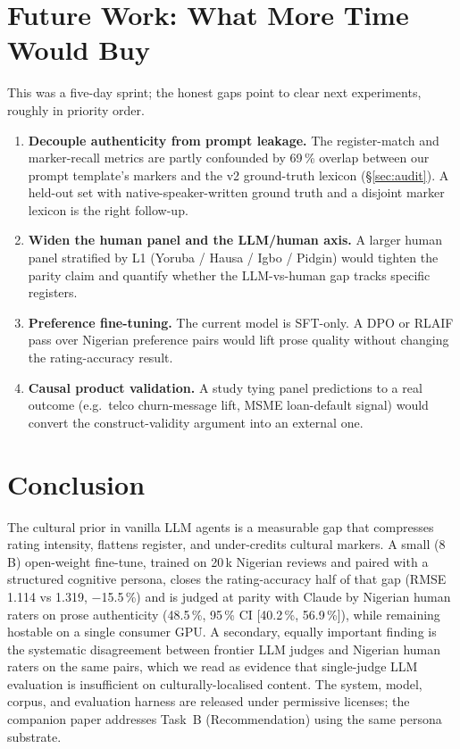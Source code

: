 \documentclass[sigconf,nonacm,balance]{acmart}
\begin{document}
\section{Future Work: What More Time Would Buy}
\label{sec:futurework}

This was a five-day sprint; the honest gaps point to clear next experiments,
roughly in priority order.

\begin{enumerate}[leftmargin=*]
  \item \textbf{Decouple authenticity from prompt leakage.} The register-match
        and marker-recall metrics are partly confounded by 69\,\% overlap
        between our prompt template's markers and the v2 ground-truth lexicon
        (\S\ref{sec:audit}). A held-out set with native-speaker-written
        ground truth and a disjoint marker lexicon is the right follow-up.
  \item \textbf{Widen the human panel and the LLM/human axis.} A larger
        human panel stratified by L1 (Yoruba / Hausa / Igbo / Pidgin) would
        tighten the parity claim and quantify whether the LLM-vs-human gap
        tracks specific registers.
  \item \textbf{Preference fine-tuning.} The current model is SFT-only.
        A DPO or RLAIF pass over Nigerian preference pairs would lift prose
        quality without changing the rating-accuracy result.
  \item \textbf{Causal product validation.} A study tying panel predictions
        to a real outcome (e.g.\ telco churn-message lift, MSME loan-default
        signal) would convert the construct-validity argument into an
        external one.
\end{enumerate}

\section{Conclusion}

The cultural prior in vanilla LLM agents is a measurable gap that
compresses rating intensity, flattens register, and under-credits
cultural markers. A small (8\,B) open-weight fine-tune, trained on
20\,k Nigerian reviews and paired with a structured cognitive persona,
closes the rating-accuracy half of that gap (RMSE 1.114 vs 1.319,
$-$15.5\,\%) and is judged at parity with Claude by Nigerian human
raters on prose authenticity (48.5\,\%, 95\,\% CI [40.2\,\%, 56.9\,\%]),
while remaining hostable on a single consumer GPU. A secondary, equally
important finding is the systematic disagreement between frontier LLM
judges and Nigerian human raters on the same pairs, which we read as
evidence that single-judge LLM evaluation is insufficient on
culturally-localised content. The system, model, corpus, and evaluation
harness are released under permissive licenses; the companion paper
addresses Task~B (Recommendation) using the same persona substrate.



\end{document}
